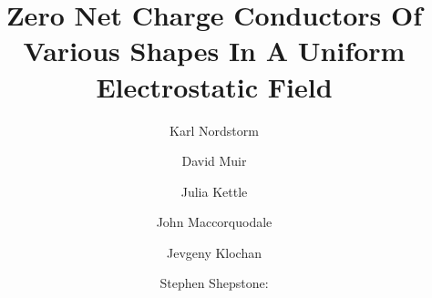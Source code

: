 \documentclass[aps,twocolumn,pre,nofootinbib]{revtex4}
\begin{document}

\newcommand{\breite}{1.0} %


\newtheorem{prop}{Proposition}
\newtheorem{cor}{Corollary}

\newcommand{\be}{\begin{equation}}
\newcommand{\ee}{\end{equation}}

\newcommand{\bea}{\begin{eqnarray}}
\newcommand{\eea}{\end{eqnarray}}

\newcommand{\Reals}{\mathbb{R}}     %
\newcommand{\Int}{\mathbb{Z}}       %
\newcommand{\Com}{\mathbb{C}}       %
\newcommand{\Nat}{\mathbb{N}}       %


\newcommand{\id}{\mathbbm{1}}    

\newcommand{\Real}{\mathop{\mathrm{Re}}}
\newcommand{\Imag}{\mathop{\mathrm{Im}}}

\def\O{\mbox{$\mathcal{O}$}}    
\def\F{\mathcal{F}}			
\def\sgn{\text{sgn}}

\newcommand{\dw}{\ensuremath{\Delta}} %
\newcommand{\wbp}{\ensuremath{\omega_0}}
\newcommand{\dv}{\ensuremath{\delta}}
\newcommand{\vbp}{\ensuremath{\nu_0}}
\newcommand{\vplus}{\ensuremath{\nu_{+}}}
\newcommand{\vminus}{\ensuremath{\nu_{-}}}
\newcommand{\wplus}{\ensuremath{\omega_{+}}}
\newcommand{\wminus}{\ensuremath{\omega_{-}}}
\newcommand{\den}{\ensuremath{\rho}}
\newcommand{\del}{\ensuremath{\nabla}}
\newcommand{\per}{\ensuremath{\epsilon_0}}
\newcommand{\pot}{\ensuremath{\phi}}



\title{Zero Net Charge Conductors Of Various Shapes In A Uniform Electrostatic Field}


\author{Karl Nordstorm}

\author{David Muir}

\author{Julia Kettle}

\author{John Maccorquodale}

\author{Jevgeny Klochan}

\author{Stephen Shepstone: }
\end{document}
